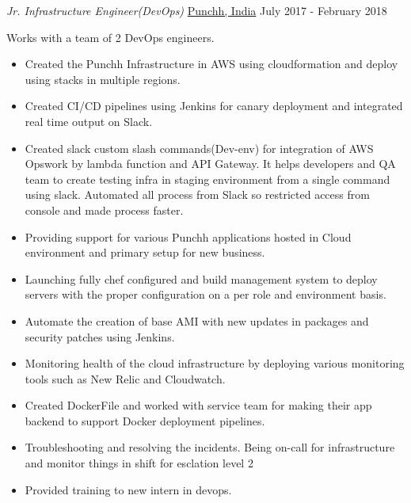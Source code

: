 \documentclass[]{friggeri-cv} %
\begin{document}
\begin{entrylist}
\entry
{\emph{Jr. Infrastructure Engineer(DevOps)}}
{\href{https://punchh.com/}{Punchh, India}}
{July 2017 - February 2018}
{Works with a team of 2 DevOps engineers.
\begin{itemize}
\item {Created the Punchh Infrastructure in AWS using cloudformation and deploy using stacks in multiple regions.}
\item {Created CI/CD pipelines using Jenkins for canary deployment and integrated real time output on Slack.}
\item {Created slack custom slash commands(Dev-env) for integration of AWS Opswork by lambda function and API Gateway. It helps developers and QA team to create testing infra in staging environment from a single command using slack. Automated all process from Slack so restricted access from console and made process faster.}
\item {Providing support for various Punchh applications hosted in Cloud environment and primary setup for new business.}
\item {Launching fully chef configured and build management system to deploy servers with the proper configuration on a per role and environment basis.}
\item {Automate the creation of base AMI with new updates in packages and security patches using Jenkins.}
\item {Monitoring health of the cloud infrastructure by deploying various monitoring tools such as New Relic and Cloudwatch.}
\item {Created DockerFile and worked with service team for making their app backend to support Docker deployment pipelines.}
\item {Troubleshooting and resolving the incidents. Being on-call for infrastructure and monitor things in shift for esclation level 2}
\item {Provided training to new intern in devops.}
\end{itemize}}
\end{entrylist}
\end{document}
